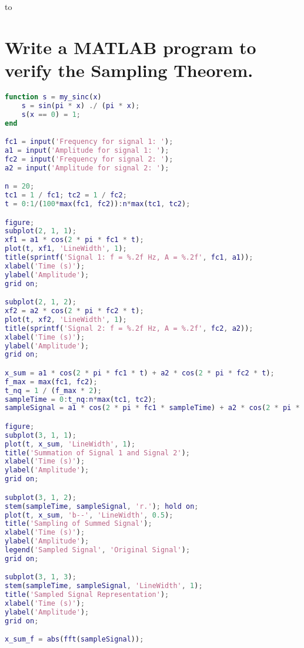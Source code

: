 \documentclass{article}
\begin{document}
\clearpage
{}
\begin{center}
    \vbox to \textheight{
        \vfill
        \lstlistoflistings
        \vfill
    }
\end{center}
\clearpage
\setcounter{page}{1}
\section{Write a MATLAB program to verify the Sampling Theorem.}
\begin{lstlisting}[language=matlab, caption=MATLAB program to verify the Sampling Theorem]
function s = my_sinc(x)
    s = sin(pi * x) ./ (pi * x);
    s(x == 0) = 1;
end

fc1 = input('Frequency for signal 1: ');
a1 = input('Amplitude for signal 1: ');
fc2 = input('Frequency for signal 2: ');
a2 = input('Amplitude for signal 2: ');

n = 20;
tc1 = 1 / fc1; tc2 = 1 / fc2;
t = 0:1/(100*max(fc1, fc2)):n*max(tc1, tc2);

figure;
subplot(2, 1, 1);
xf1 = a1 * cos(2 * pi * fc1 * t);
plot(t, xf1, 'LineWidth', 1); 
title(sprintf('Signal 1: f = %.2f Hz, A = %.2f', fc1, a1));
xlabel('Time (s)');
ylabel('Amplitude');
grid on;

subplot(2, 1, 2);
xf2 = a2 * cos(2 * pi * fc2 * t);
plot(t, xf2, 'LineWidth', 1); 
title(sprintf('Signal 2: f = %.2f Hz, A = %.2f', fc2, a2));
xlabel('Time (s)');
ylabel('Amplitude');
grid on;

x_sum = a1 * cos(2 * pi * fc1 * t) + a2 * cos(2 * pi * fc2 * t);
f_max = max(fc1, fc2);
t_nq = 1 / (f_max * 2);
sampleTime = 0:t_nq:n*max(tc1, tc2);
sampleSignal = a1 * cos(2 * pi * fc1 * sampleTime) + a2 * cos(2 * pi * fc2 * sampleTime);

figure;
subplot(3, 1, 1);
plot(t, x_sum, 'LineWidth', 1); 
title('Summation of Signal 1 and Signal 2');
xlabel('Time (s)');
ylabel('Amplitude');
grid on;

subplot(3, 1, 2);
stem(sampleTime, sampleSignal, 'r.'); hold on;
plot(t, x_sum, 'b--', 'LineWidth', 0.5); 
title('Sampling of Summed Signal');
xlabel('Time (s)');
ylabel('Amplitude');
legend('Sampled Signal', 'Original Signal');
grid on;

subplot(3, 1, 3);
stem(sampleTime, sampleSignal, 'LineWidth', 1); 
title('Sampled Signal Representation');
xlabel('Time (s)');
ylabel('Amplitude');
grid on;

x_sum_f = abs(fft(sampleSignal));


\end{lstlisting}
\end{document}
